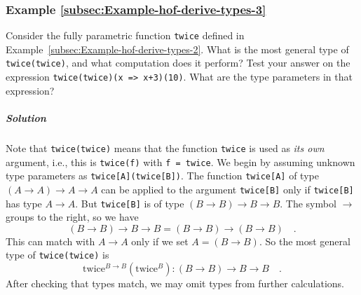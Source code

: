 \subsubsection{Example \label{subsec:Example-hof-derive-types-3}\ref{subsec:Example-hof-derive-types-3}}

Consider the fully parametric function \lstinline!twice! defined
in Example~\ref{subsec:Example-hof-derive-types-2}. What is the
most general type of \lstinline!twice(twice)!, and what computation
does it perform? Test your answer on the expression \lstinline!twice(twice)(x => x+3)(10)!.
What are the type parameters in that expression?

\subparagraph{Solution}

Note that \lstinline!twice(twice)! means that the function \lstinline!twice!
is used as \emph{its own} argument, i.e., this is \lstinline!twice(f)!
with \lstinline!f = twice!. We begin by assuming unknown type parameters
as \lstinline!twice[A](twice[B])!. The function \lstinline!twice[A]!
of type $\left(A\rightarrow A\right)\rightarrow A\rightarrow A$ can
be applied to the argument \lstinline!twice[B]! only if \lstinline!twice[B]!
has type $A\rightarrow A$. But \lstinline!twice[B]! is of type $\left(B\rightarrow B\right)\rightarrow B\rightarrow B$.
The symbol $\rightarrow$ groups to the right, so we have
\[
\left(B\rightarrow B\right)\rightarrow B\rightarrow B=\left(B\rightarrow B\right)\rightarrow\left(B\rightarrow B\right)\quad.
\]
This can match with $A\rightarrow A$ only if we set $A=\left(B\rightarrow B\right)$.
So the most general type of \lstinline!twice(twice)! is
\begin{equation}
\text{twice}^{B\rightarrow B}(\text{twice}^{B}):\left(B\rightarrow B\right)\rightarrow B\rightarrow B\quad.\label{eq:hof-twice-example-solved3}
\end{equation}
After checking that types match, we may omit types from further calculations.

